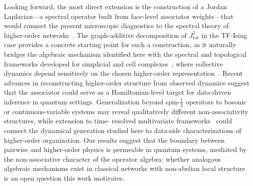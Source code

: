 \documentclass[aps,physrev,preprint,groupedaddress]{revtex4-2}
\begin{document}
Looking forward, the most direct extension is the construction of a Jordan Laplacian---a spectral operator built from face-level associator weights---that would connect the present microscopic diagnostics to the spectral theory of higher-order networks~\cite{
battiston2021PhysicsHigherorder, bianconi2021HigherOrderNetworks}. The graph-additive decomposition of $J_{\mathrm{tot}}^2$ in the TF-Ising case provides a concrete starting point for such a construction, as it naturally bridges the algebraic mechanism identified here with the spectral and topological frameworks developed for simplicial and cell complexes~\cite{
carletti2023GlobalTopological, schaub2021SignalProcessing}, where collective dynamics depend sensitively on the chosen higher-order representation~\cite{zhang2023HigherorderInteractions}. Recent advances in reconstructing higher-order structure from observed dynamics \cite{delabays2025HypergraphReconstruction, hood2026BroadSpectrum} suggest that the associator could serve as a Hamiltonian-level target for data-driven inference in quantum settings. Generalization beyond spin-$\tfrac{1}{2}$ operators to bosonic or continuous-variable systems may reveal qualitatively different non-associativity structures, while extension to time-
resolved multivariate frameworks~\cite{santoro2023HigherorderOrganization} could connect the dynamical generation studied here to data-side characterizations of higher-order organization. Our results suggest that the boundary between pairwise and higher-order physics is permeable in quantum systems, mediated by the non-associative character of the operator algebra; whether analogous algebraic mechanisms exist in classical networks with non-abelian local structure is an open question this work motivates.


\end{document}

